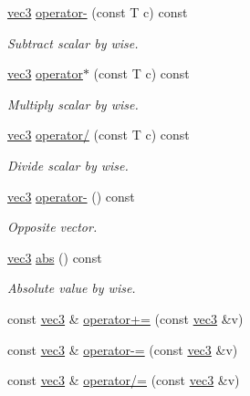 \begin{DoxyCompactItemize}
\mbox{\hyperlink{struct_space_h_1_1vec3}{vec3}} \mbox{\hyperlink{struct_space_h_1_1vec3_a05e464381d8e6757e6604fd42a62fec6}{operator-\/}} (const T c) const
\begin{DoxyCompactList}\small\item\em Subtract scalar by wise. \end{DoxyCompactList}\item 
\mbox{\hyperlink{struct_space_h_1_1vec3}{vec3}} \mbox{\hyperlink{struct_space_h_1_1vec3_adb9a23774fc263d23487bdc6d2e253ce}{operator$\ast$}} (const T c) const
\begin{DoxyCompactList}\small\item\em Multiply scalar by wise. \end{DoxyCompactList}\item 
\mbox{\hyperlink{struct_space_h_1_1vec3}{vec3}} \mbox{\hyperlink{struct_space_h_1_1vec3_af3f90f3a0f92d6ee7bd8b413b14d2aaf}{operator/}} (const T c) const
\begin{DoxyCompactList}\small\item\em Divide scalar by wise. \end{DoxyCompactList}\item 
\mbox{\hyperlink{struct_space_h_1_1vec3}{vec3}} \mbox{\hyperlink{struct_space_h_1_1vec3_a74db760e195c089b32b5319e9d45028e}{operator-\/}} () const
\begin{DoxyCompactList}\small\item\em Opposite vector. \end{DoxyCompactList}\item 
\mbox{\hyperlink{struct_space_h_1_1vec3}{vec3}} \mbox{\hyperlink{struct_space_h_1_1vec3_af82905f49546b9aa03799dcd87bdff0c}{abs}} () const
\begin{DoxyCompactList}\small\item\em Absolute value by wise. \end{DoxyCompactList}\item 
const \mbox{\hyperlink{struct_space_h_1_1vec3}{vec3}} \& \mbox{\hyperlink{struct_space_h_1_1vec3_a5a9143627e21c4b343b4ac44a5759cc8}{operator+=}} (const \mbox{\hyperlink{struct_space_h_1_1vec3}{vec3}} \&v)
\item 
const \mbox{\hyperlink{struct_space_h_1_1vec3}{vec3}} \& \mbox{\hyperlink{struct_space_h_1_1vec3_a54124bffc816d8dcf912422647bac6c3}{operator-\/=}} (const \mbox{\hyperlink{struct_space_h_1_1vec3}{vec3}} \&v)
\item 
const \mbox{\hyperlink{struct_space_h_1_1vec3}{vec3}} \& \mbox{\hyperlink{struct_space_h_1_1vec3_a0de32a9762524bf50e592c5a463c29e2}{operator/=}} (const \mbox{\hyperlink{struct_space_h_1_1vec3}{vec3}} \&v)

\end{DoxyCompactItemize}
